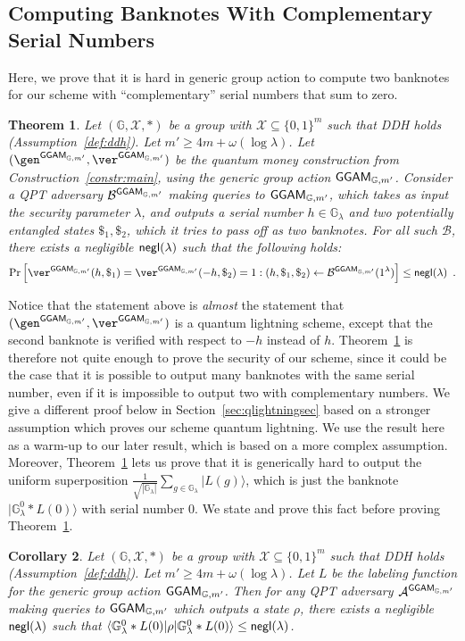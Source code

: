 \documentclass{article}\usepackage[a4paper,margin=20mm]{geometry}
\newtheorem{theorem}{Theorem}\newtheorem{lemma}[theorem]{Lemma}\newtheorem{proposition}[theorem]{Proposition}\newtheorem{corollary}[theorem]{Corollary}\newtheorem{definition}[theorem]{Definition}\newtheorem{claim}[theorem]{Claim}\newtheorem{remark}[theorem]{Remark}\newtheorem{observation}[theorem]{Observation}\newtheorem{conjecture}[theorem]{Conjecture}\newtheorem{example}[theorem]{Example}
\numberwithin{theorem}{section}
\numberwithin{equation}{section}
\newcommand{\G}{\mathbb{G}}
\newcommand{\As}{{\mathcal{A}}}
\newcommand{\Bs}{{\mathcal{B}}}
\newcommand{\Xs}{{\mathcal{X}}}
\newcommand{\negl}{{\sf negl}}
\newcommand{\GGAM}{{\sf GGAM}}
\begin{document}
\subsection{Computing Banknotes With Complementary Serial Numbers}

Here, we prove that it is hard in generic group action to compute two banknotes for our scheme with ``complementary'' serial numbers that sum to zero. 

\begin{theorem}\label{thm:almostlightning}Let $(\G,\Xs,*)$ be a group with $\Xs\subseteq\{0,1\}^m$ such that DDH holds (Assumption~\ref{def:ddh}). Let $m'\geq 4m+\omega(\log\lambda)$. Let $(\gen^{\GGAM_{\G,m'}},\ver^{\GGAM_{\G,m'}})$ be the quantum money construction from Construction~\ref{constr:main}, using the generic group action $\GGAM_{\G,m'}$. Consider a QPT adversary $\Bs^{\GGAM_{\G,m'}}$ making queries to $\GGAM_{\G,m'}$, which takes as input the security parameter $\lambda$, and outputs a serial number $h\in\G_\lambda$ and two potentially entangled states $\$_1,\$_2$, which it tries to pass off as two banknotes. For all such $\Bs$, there exists a negligible $\negl(\lambda)$ such that the following holds:
	\[\Pr\left[\ver^{\GGAM_{\G,m'}}(h,\$_1)=\ver^{\GGAM_{\G,m'}}(-h,\$_2)=1:(h,\$_1,\$_2)\gets\Bs^{\GGAM_{\G,m'}}(1^\lambda)\right]\leq\negl(\lambda)\enspace .\]
\end{theorem}
Notice that the statement above is \emph{almost} the statement that $(\gen^{\GGAM_{\G,m'}},\ver^{\GGAM_{\G,m'}})$ is a quantum lightning scheme, except that the second banknote is verified with respect to $-h$ instead of $h$. Theorem~\ref{thm:almostlightning} is therefore not quite enough to prove the security of our scheme, since it could be the case that it is possible to output many banknotes with the same serial number, even if it is impossible to output two with complementary numbers. We give a different proof below in Section~\ref{sec:qlightningsec} based on a stronger assumption which proves our scheme quantum lightning. We use the result here as a warm-up to our later result, which is based on a more complex assumption. Moreover, Theorem~\ref{thm:almostlightning} lets us prove that it is generically hard to output the uniform superposition $\frac{1}{\sqrt{|\G_\lambda|}}\sum_{g\in\G_\lambda}|L(g)\rangle$, which is just the banknote $|\G^0_\lambda*L(0)\rangle$ with serial number $0$. We state and prove this fact before proving Theorem~\ref{thm:almostlightning}.
\begin{corollary}\label{cor:nozero}Let $(\G,\Xs,*)$ be a group with $\Xs\subseteq\{0,1\}^m$ such that DDH holds (Assumption~\ref{def:ddh}). Let $m'\geq 4m+\omega(\log\lambda)$. Let $L$ be the labeling function for the generic group action $\GGAM_{\G,m'}$. Then for any QPT adversary $\As^{\GGAM_{\G,m'}}$ making queries to $\GGAM_{\G,m'}$ which outputs a state $\rho$, there exists a negligible $\negl(\lambda)$ such that $\langle\G^0_\lambda*L(0)|\rho|\G^0_\lambda*L(0)\rangle\leq\negl(\lambda)$.
\end{corollary}
\end{document}
